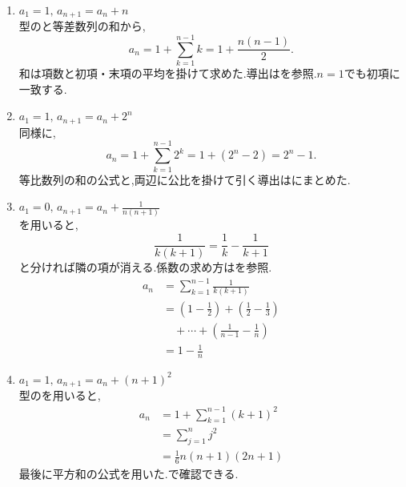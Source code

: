   \noindent{}\par\nobreak
  \begin{enumerate}[label=(\arabic*),parsep=3pt,format=\bookitemlink{example-difference-1}{solution}{problem}]
    \item $a_1=1,\,a_{n+1}=a_n+n$\\
      型のと等差数列の和から,
      \[
        a_n=1+\sum_{k=1}^{n-1}k=1+\frac{n(n-1)}2.
      \]
      和は項数と初項・末項の平均を掛けて求めた.導出はを参照.$n=1$でも初項に一致する.
  
    \item $a_1=1,\,a_{n+1}=a_n+2^n$\\
      同様に,
      \[
        a_n=1+\sum_{k=1}^{n-1}2^k=1+(2^n-2)=2^n-1.
      \]
      等比数列の和の公式と,両辺に公比を掛けて引く導出はにまとめた.
  
    \item $a_1=0,\,a_{n+1}=a_n+\frac{1}{n(n+1)}$\\
      を用いると,
      \[
        \frac{1}{k(k+1)}
        =\frac{1}{k}-\frac{1}{k+1}
      \]
      と分ければ隣の項が消える.係数の求め方はを参照.
      \begin{align*}
        a_n
        &=\sum_{k=1}^{n-1}\frac{1}{k(k+1)}\\
        &=\left(1-\frac12\right)+\left(\frac12-\frac13\right)\\
        &\quad+\cdots+\left(\frac1{n-1}-\frac1n\right)\\
        &=1-\frac1n
      \end{align*}
  
    \item $a_1=1,\,a_{n+1}=a_n+(n+1)^2$\\
      型のを用いると,
      \begin{align*}
        a_n
        &=1+\sum_{k=1}^{n-1}(k+1)^2\\
        &=\sum_{j=1}^{n}j^2\\
        &=\frac{1}{6}n(n+1)(2n+1)
      \end{align*}
      最後に平方和の公式を用いた.で確認できる.
  \end{enumerate}
